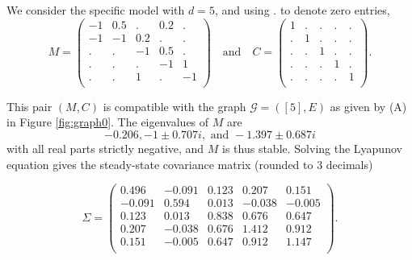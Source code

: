 \documentclass[10pt,twoside,a4paper]{amsart}
\begin{document}
\begin{ex} \label{ex:graph0} We consider the specific model with $d = 5$, 
    and using $.$ to denote zero entries, 
  $$M = \left(\begin{array}{rrrrr}
  -1 & 0.5 & . & 0.2 & . \\ 
    -1 & -1 & 0.2 & . & . \\ 
    . & . & -1 & 0.5 & . \\ 
    . & . & . & -1 & 1 \\ 
    . & . & 1 & . & -1 \\ 
  \end{array}\right) \quad \text{and} \quad C = \left(\begin{array}{rrrrr}
    1 & . & . & . & . \\ 
    . & 1 & . & . & . \\ 
    . & . & 1 & . & . \\ 
    . & . & . & 1 & . \\ 
    . & . & . & . & 1 \\ 
  \end{array}\right).$$

This pair $(M, C)$ is compatible with the graph $\mathcal{G} = ([5],
E)$ as given by (A) in Figure \ref{fig:graph0}. The eigenvalues of $M$ are 
\[ 
    -0.206,  -1 \pm 0.707i, \text{ and } -1.397 \pm 0.687i
\]
  with all real parts strictly negative, and $M$ is thus stable. Solving the 
  Lyapunov equation gives the steady-state covariance matrix (rounded to 3 decimals)
  
\[
       \Sigma = \left(\begin{array}{rrrrr}
        0.496 & -0.091 & 0.123 & 0.207 & 0.151 \\
        -0.091 & 0.594 & 0.013 & -0.038 & -0.005 \\
        0.123 & 0.013 & 0.838 & 0.676 & 0.647 \\
        0.207 & -0.038 & 0.676 & 1.412 & 0.912 \\
        0.151 & -0.005 & 0.647 & 0.912 & 1.147 \\
    \end{array}\right).
\]  

\end{ex}
\end{document}

